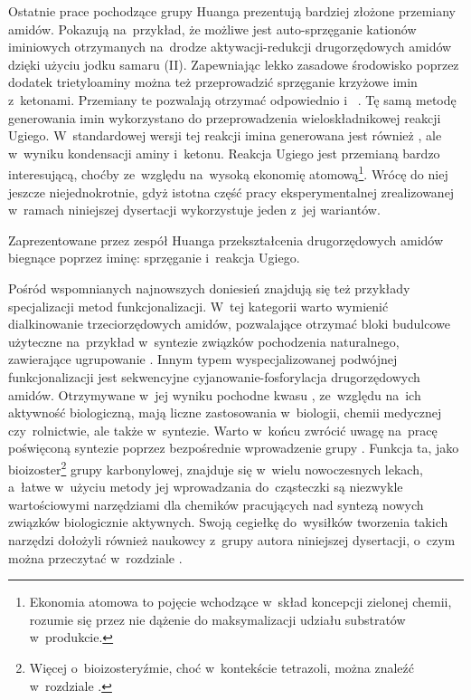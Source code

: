 Ostatnie prace pochodzące grupy Huanga prezentują bardziej złożone przemiany amidów.
Pokazują na~przykład, że możliwe jest auto-sprzęganie kationów iminiowych  otrzymanych na~drodze
  aktywacji-redukcji drugorzędowych amidów  dzięki użyciu jodku samaru (II).
Zapewniając lekko zasadowe środowisko poprzez dodatek trietyloaminy można też przeprowadzić
  sprzęganie krzyżowe imin  z~ketonami.
Przemiany te pozwalają otrzymać odpowiednio  
  i~ .
Tę samą metodę generowania imin wykorzystano do przeprowadzenia wieloskładnikowej reakcji Ugiego.
W~standardowej wersji tej reakcji imina  generowana jest również ,
  ale w~wyniku kondensacji aminy i~ketonu.
Reakcja Ugiego jest przemianą bardzo interesującą, choćby ze~względu na~wysoką ekonomię atomową\footnote{%
  Ekonomia atomowa to pojęcie wchodzące w~skład koncepcji zielonej chemii,
  rozumie się przez nie dążenie do maksymalizacji udziału substratów w~produkcie.
}.
Wrócę do niej jeszcze niejednokrotnie, gdyż istotna część pracy eksperymentalnej
  zrealizowanej w~ramach niniejszej dysertacji wykorzystuje jeden z~jej wariantów.
\begin{scheme*}
  \centering
  
  \caption{
    Zaprezentowane przez zespół Huanga przekształcenia drugorzędowych amidów biegnące poprzez iminę: sprzęganie i~reakcja Ugiego.
  }
  \label{sch:huang-ugi-diamine}
\end{scheme*}

Pośród wspomnianych najnowszych doniesień znajdują się też przykłady specjalizacji metod funkcjonalizacji.
W~tej kategorii warto wymienić dialkinowanie trzeciorzędowych amidów,
  pozwalające otrzymać bloki budulcowe użyteczne na~przykład w~syntezie związków pochodzenia naturalnego,
  zawierające ugrupowanie .
Innym typem wyspecjalizowanej podwójnej funkcjonalizacji jest sekwencyjne cyjanowanie-fosforylacja
  drugorzędowych amidów.
Otrzymywane w~jej wyniku pochodne kwasu , ze~względu na~ich aktywność biologiczną,
  mają liczne zastosowania w~biologii, chemii medycznej czy~rolnictwie, ale także w~syntezie.
Warto w~końcu zwrócić uwagę na~pracę poświęconą syntezie 
  poprzez bezpośrednie wprowadzenie grupy .
Funkcja ta, jako bioizoster\footnote{%
    Więcej o~bioizosteryźmie, choć w~kontekście tetrazoli, można znaleźć w~rozdziale .%
  } grupy karbonylowej, znajduje się w~wielu nowoczesnych lekach,
  a~łatwe w~użyciu metody jej wprowadzania do~cząsteczki są niezwykle wartościowymi narzędziami
  dla chemików pracujących nad syntezą nowych związków biologicznie aktywnych.
Swoją cegiełkę do~wysiłków tworzenia takich narzędzi dołożyli również naukowcy z~grupy autora niniejszej dysertacji,
  o~czym można przeczytać w~rozdziale .


